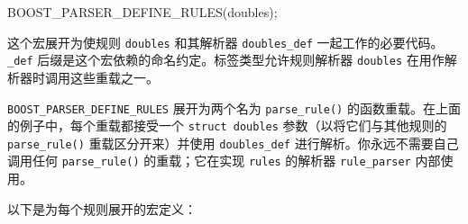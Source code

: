 \begin{code}
BOOST_PARSER_DEFINE_RULES(doubles);
\end{code}

这个宏展开为使规则 \texttt{doubles} 和其解析器 \texttt{doubles\_def} 一起工作的必要代码。 \texttt{\_def} 后缀是这个宏依赖的命名约定。标签类型允许规则解析器 \texttt{doubles} 在用作解析器时调用这些重载之一。

\texttt{BOOST\_PARSER\_DEFINE\_RULES} 展开为两个名为 \texttt{parse\_rule()} 的函数重载。在上面的例子中，每个重载都接受一个 \texttt{struct doubles} 参数（以将它们与其他规则的 \texttt{parse\_rule()} 重载区分开来）并使用 \texttt{doubles\_def} 进行解析。你永远不需要自己调用任何 \texttt{parse\_rule()} 的重载；它在实现 \texttt{rules} 的解析器 \texttt{rule\_parser} 内部使用。

以下是为每个规则展开的宏定义：
